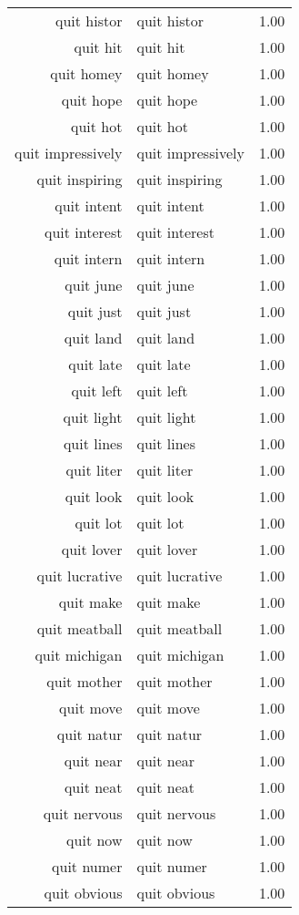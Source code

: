 \begin{table}[ht]
\begin{tabular}{rlr}
  quit histor & quit histor & 1.00 \\ 
  quit hit & quit hit & 1.00 \\ 
  quit homey & quit homey & 1.00 \\ 
  quit hope & quit hope & 1.00 \\ 
  quit hot & quit hot & 1.00 \\ 
  quit impressively & quit impressively & 1.00 \\ 
  quit inspiring & quit inspiring & 1.00 \\ 
  quit intent & quit intent & 1.00 \\ 
  quit interest & quit interest & 1.00 \\ 
  quit intern & quit intern & 1.00 \\ 
  quit june & quit june & 1.00 \\ 
  quit just & quit just & 1.00 \\ 
  quit land & quit land & 1.00 \\ 
  quit late & quit late & 1.00 \\ 
  quit left & quit left & 1.00 \\ 
  quit light & quit light & 1.00 \\ 
  quit lines & quit lines & 1.00 \\ 
  quit liter & quit liter & 1.00 \\ 
  quit look & quit look & 1.00 \\ 
  quit lot & quit lot & 1.00 \\ 
  quit lover & quit lover & 1.00 \\ 
  quit lucrative & quit lucrative & 1.00 \\ 
  quit make & quit make & 1.00 \\ 
  quit meatball & quit meatball & 1.00 \\ 
  quit michigan & quit michigan & 1.00 \\ 
  quit mother & quit mother & 1.00 \\ 
  quit move & quit move & 1.00 \\ 
  quit natur & quit natur & 1.00 \\ 
  quit near & quit near & 1.00 \\ 
  quit neat & quit neat & 1.00 \\ 
  quit nervous & quit nervous & 1.00 \\ 
  quit now & quit now & 1.00 \\ 
  quit numer & quit numer & 1.00 \\ 
  quit obvious & quit obvious & 1.00 \\ 

\end{tabular}
\end{table}
